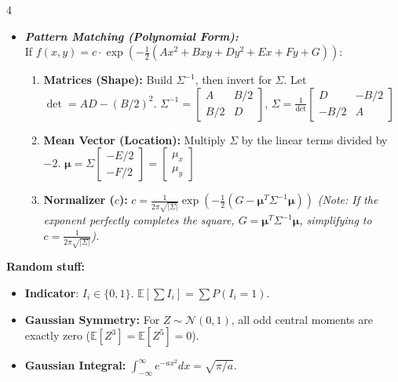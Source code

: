 \documentclass[9pt]{extarticle}
\begin{document}
\begin{multicols*}{4}
\begin{itemize}
    \item \textbf{\textit{Pattern Matching (Polynomial Form):}} \\
        If $f(x,y) = c \cdot \exp\left( -\frac{1}{2} (Ax^2 + Bxy + Dy^2 + Ex + Fy + G) \right)$:
        \begin{enumerate}
            \item \textbf{Matrices (Shape):} Build $\Sigma^{-1}$, then invert for $\Sigma$. Let $\det = AD - (B/2)^2$.
            $ \Sigma^{-1} = \begin{bmatrix} A & B/2 \\ B/2 & D \end{bmatrix}$, $\Sigma = \frac{1}{\det} \begin{bmatrix} D & -B/2 \\ -B/2 & A \end{bmatrix}$ 
            \item \textbf{Mean Vector (Location):} Multiply $\Sigma$ by the linear terms divided by $-2$.
            $ \boldsymbol{\mu} = \Sigma \begin{bmatrix} -E/2 \\ -F/2 \end{bmatrix} = \begin{bmatrix} \mu_x \\ \mu_y \end{bmatrix} $
            \item \textbf{Normalizer ($c$):} 
            $ c = \frac{1}{2\pi \sqrt{|\Sigma|}} \exp\left(-\frac{1}{2}(G - \boldsymbol{\mu}^T \Sigma^{-1} \boldsymbol{\mu})\right) $
            \textit{(Note: If the exponent perfectly completes the square, $G = \boldsymbol{\mu}^T \Sigma^{-1} \boldsymbol{\mu}$, simplifying to $c = \frac{1}{2\pi \sqrt{|\Sigma|}}$).}
        \end{enumerate}
\end{itemize}
\textbf{Random stuff:}
\begin{itemize}
    \item \textbf{Indicator}: $I_i \in \{0,1\}$. $\mathbb{E}[\sum I_i] = \sum P(I_i=1)$.
    \item \textbf{Gaussian Symmetry:} For $Z \sim \mathcal{N}(0,1)$, all odd central moments are exactly zero ($\mathbb{E}[Z^3] = \mathbb{E}[Z^5] = 0$).
    \item \textbf{Gaussian Integral:} $\int_{-\infty}^{\infty} e^{-ax^2} dx = \sqrt{\pi/a}$.

\end{itemize}
\end{multicols*}
\end{document}
